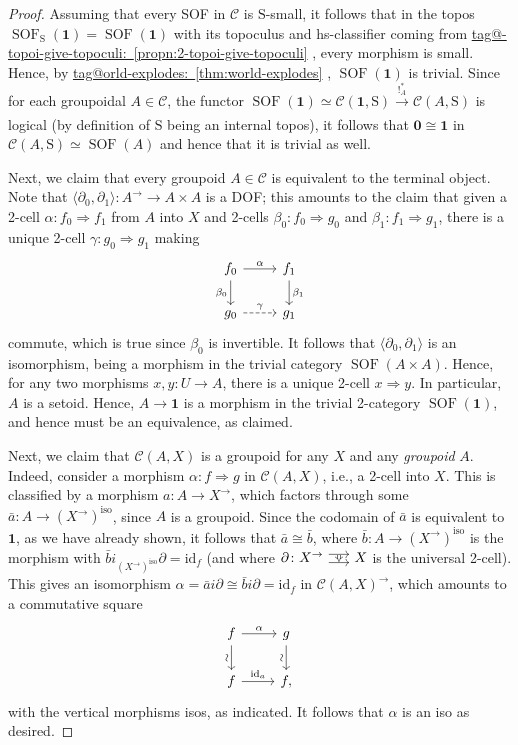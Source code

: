 \documentclass{amsart}
\makeatletter
\newcommand\ari[1][]{\ar["\sim"', sloped, #1]}
\newcommand\br[1]{\langle{}#1\rangle{}}
\newcommand\cC{\mathcal{C}}
\newcommand\id{\mathrm{id}}
\newcommand\iso{\mathrm{iso}}
\newcommand\rS{\mathrm{S}}
\newcommand\SOF{\operatorname{SOF}}
\newcommand\tm{\mathbf{1}}
\newcommand\tocell{\hspace{-5pt}\begin{tikzcd}[column sep=15pt, ampersand replacement=\&]{}\ar[r, shift left=3pt, ""{name=top}]\ar[r, shift right=3pt, ""'{name=bot}, start anchor=east, end anchor=west]\&{}\ar[Rightarrow, from=top, to=bot, shorten=0.5pt]\end{tikzcd}\hspace{-5pt}}
\newcommand\tox[2][]{\xrightarrow[#1]{#2}}
\newcommand\To{\Rightarrow}
\newcommand\unex{{!}}
\newcommand\zset{\mathbf{0}}
\newcommand\tagword[1]{\csname tag@#1\endcsname}
\def\label@tag#1:#2\@nil{#1}
\newcommand\labeltag[1]{\label@tag#1:\@nil}
\newcommand\jref[1]{%
  \texorpdfstring%
    {\hyperref[#1]{\tagword{\labeltag{#1}}~\ref*{#1}}}%
    {\tagword{\labeltag{#1}}~\ref*{#1}}%
}
\theoremstyle{definition}
\theoremstyle{remark}
\theoremstyle{plainwithref}
\makeatother
\begin{document}
\begin{proof}
  Assuming that every SOF in \( \cC \) is \( \rS \)-small, it follows that in the topos \( \SOF_\rS(\tm) = \SOF(\tm) \) with its topoculus and hs-classifier coming from \jref{propn:2-topoi-give-topoculi}, every morphism is small.
  Hence, by \jref{thm:world-explodes}, \( \SOF(\tm) \) is trivial.
  Since for each groupoidal \( A \in \cC \), the functor \( \SOF(\tm) \simeq \cC(\tm, \rS) \tox{\unex_A^*} \cC(A, \rS) \) is logical (by definition of \( \rS \) being an internal topos), it follows that \( \zset \cong \tm \) in \( \cC(A, \rS) \simeq \SOF(A) \) and hence that it is trivial as well.

  Next, we claim that every groupoid \( A \in \cC \) is equivalent to the terminal object.
  Note that \( \br{\partial_0,\partial_1} \colon A^\to \to A \times A \) is a DOF; this amounts to the claim that given a 2-cell \( \alpha \colon f_0 \To f_1 \) from \( A \) into \( X \) and 2-cells \( \beta_0 \colon f_0 \To g_0 \) and \( \beta_1 \colon f_1 \To g_1 \), there is a unique 2-cell \( \gamma \colon g_0 \To g_1 \) making
  \[
    \begin{tikzcd}
      f_0 \ar[r, "\alpha"] \ar[d, "\beta_0"'] & f_1 \ar[d, "\beta_1"] \\
      g_0 \ar[r, "\gamma", dashed] & g_1
    \end{tikzcd}
  \]
  commute, which is true since \( \beta_0 \) is invertible.
  It follows that \( \br{\partial_0, \partial_1} \) is an isomorphism, being a morphism in the trivial category \( \SOF(A \times A) \).
  Hence, for any two morphisms \( x,y \colon U \to A \), there is a unique 2-cell \( x \To y \).
  In particular, \( A \) is a setoid.
  Hence, \( A \to \tm \) is a morphism in the trivial 2-category \( \SOF(\tm) \), and hence must be an equivalence, as claimed.

  Next, we claim that \( \cC(A, X) \) is a groupoid for any \( X \) and any \emph{groupoid} \( A \).
  Indeed, consider a morphism \( \alpha \colon f \To g \) in \( \cC(A, X) \), i.e., a 2-cell into \( X \).
  This is classified by a morphism \( a \colon A \to X^\to \), which factors through some \( \bar a \colon A \to (X^\to)^\iso \), since \( A \) is a groupoid.
  Since the codomain of \( \bar a \) is equivalent to \( \tm \), as we have already shown, it follows that \( \bar a \cong \bar b \), where \( \bar b \colon A \to (X^\to)^\iso \) is the morphism with \( \bar b i_{(X^\to)^\iso} \partial = \id_f \) (and where \( \partial \colon X^\to \tocell X \) is the universal 2-cell).
  This gives an isomorphism \( \alpha = \bar a i \partial \cong \bar b i \partial = \id_f \) in \( \cC(A, X)^\to \), which amounts to a commutative square
  \[
    \begin{tikzcd}
      f \ar[r, "\alpha"] \ari[d, ""'] & g \ari[d, ""] \\
      f \ar[r, "\id_a"] & f,
    \end{tikzcd}
  \]
  with the vertical morphisms isos, as indicated.
  It follows that \( \alpha \) is an iso as desired.


\end{proof}
\end{document}
